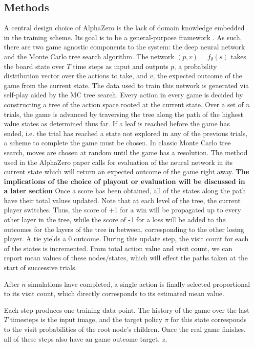 \documentclass[twoside,11pt]{article}
\begin{document}
\subsection{Methods}
A central design choice of AlphaZero is the lack of domain knowledge embedded in the training 
scheme. Its goal is to be a general-purpose framework 
. As such, there are two game agnostic components to the system: the deep neural network and the
Monte Carlo tree search algorithm. The network $(p,v) = f_{\theta}(s)$
takes the board state over $T$ time steps as input and outputs $p$, a probability distribution vector
over the actions to take, and  $v$, the expected outcome of the game from the current state.
The data used to train this network is generated via self-play aided by the MC tree search. 
Every action in every game is decided by constructing a tree of the action space rooted at 
the current state. Over a set of
$n$ trials, the game is advanced by traversing the tree along the path of the highest
value states as determined thus far. If a leaf is reached before the game has ended, i.e. the trial
has reached a state not explored in any of the previous trials, a scheme to complete the game must be chosen.
In classic Monte Carlo tree search, moves are chosen at random until the game has a resolution. 
The method used in the AlphaZero paper calls for evaluation of the neural network in its current state
which will return an expected outcome of the game right away.
 \textbf{The implications of the choice of playout or evaluation
will be discussed in a later section}
Once a score has been obtained, all of the states along the path have their total values updated.
Note that at each level of the tree, the current player switches. Thus, the score of +1 for a win
will be propagated up to every other layer in the tree, while the score of -1 for a loss will be added
to the outcomes for the layers of the tree in between, corresponding to the other losing player. 
A tie yields a 0 outcome. During this  update step, the visit count for each of the states is incremented. 
From total action value and visit count, we can report 
mean values of these nodes/states, which will effect the paths taken at the start of successive trials.

After $n$ simulations have completed, a single action is finally selected proportional to its visit
count, which directly corresponds to its estimated mean value.

Each step produces one training data point. The history of the game over the last $T$ timesteps
is the input image, and the target policy $\pi$ for this state corresponds to the 
visit probabilities of the root node's children. Once the real game finishes, all of these steps
also have an game outcome target, $z$. 
 
\end{document}
